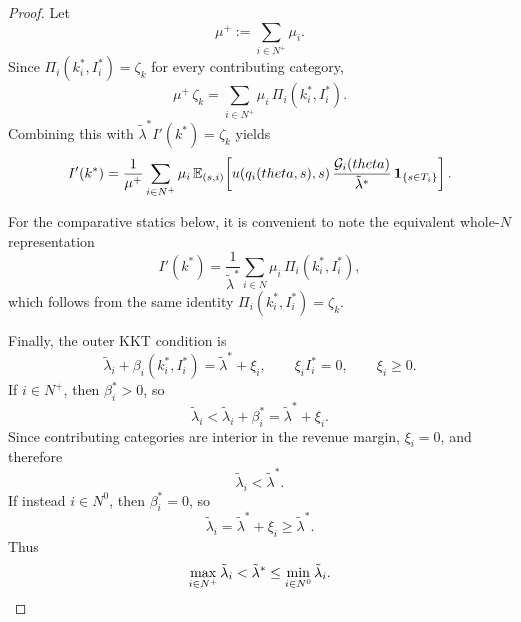 \documentclass[master.tex]{subfiles}
\begin{document}
\begin{proof}
Let
\[
\mu^+ := \sum_{i\in N^+}\mu_i.
\]
Since $\Pi_i(k_i^\ast,I_i^\ast)=\zeta_k$ for every contributing category,
\[
\mu^+\,\zeta_k
=
\sum_{i\in N^+}\mu_i\,\Pi_i(k_i^\ast,I_i^\ast).
\]
Combining this with $\tilde\lambda^\ast I'(k^\ast)=\zeta_k$ yields
\[
I'(k^\ast)
=
\frac{1}{\mu^+}
\sum_{i\in N^+}\mu_i\,
\mathbb{E}_{(s,i)}\!\left[
u(q_i(theta,s),s)\,
\frac{\mathcal{G}_i(theta)}{\tilde\lambda^\ast}\,
\mathbf 1_{\{s\in T_i\}}
\right].
\]

For the comparative statics below, it is convenient to note the equivalent whole-$N$ representation
\[
I'(k^\ast)
=
\frac{1}{\tilde\lambda^\ast}
\sum_{i\in N}\mu_i\,\Pi_i(k_i^\ast,I_i^\ast),
\]
which follows from the same identity $\Pi_i(k_i^\ast,I_i^\ast)=\zeta_k$.

Finally, the outer KKT condition is
\[
\tilde\lambda_i+\beta_i(k_i^\ast,I_i^\ast)=\tilde\lambda^\ast+\xi_i,
\qquad
\xi_i I_i^\ast=0,
\qquad
\xi_i\geq 0.
\]
If $i\in N^+$, then $\beta_i^\ast>0$, so
\[
\tilde\lambda_i<\tilde\lambda_i+\beta_i^\ast=\tilde\lambda^\ast+\xi_i.
\]
Since contributing categories are interior in the revenue margin, $\xi_i=0$, and therefore
\[
\tilde\lambda_i<\tilde\lambda^\ast.
\]
If instead $i\in N^0$, then $\beta_i^\ast=0$, so
\[
\tilde\lambda_i=\tilde\lambda^\ast+\xi_i\geq \tilde\lambda^\ast.
\]
Thus
\[
\max_{i\in N^+}\tilde\lambda_i
<
\tilde\lambda^\ast
\leq
\min_{i\in N^0}\tilde\lambda_i.
\qedhere
\]
\end{proof}

\end{document}
